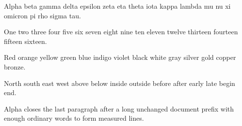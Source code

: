 
\hsize=220pt \vsize=240pt
Alpha beta gamma delta epsilon zeta eta theta iota kappa lambda mu nu xi omicron pi rho sigma tau.

One two three four five six seven eight nine ten eleven twelve thirteen fourteen fifteen sixteen.

Red orange yellow green blue indigo violet black white gray silver gold copper bronze.

North south east west above below inside outside before after early late begin end.

Alpha closes the last paragraph after a long unchanged document prefix with enough ordinary words to form measured lines.
\bye
